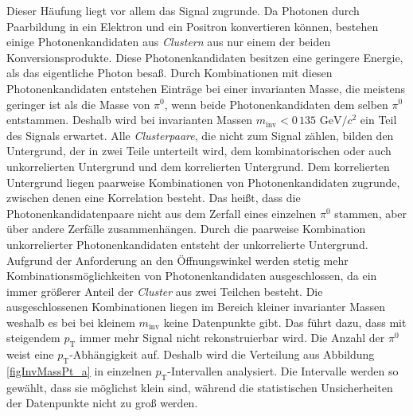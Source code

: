 Dieser Häufung liegt vor allem das Signal zugrunde.
Da Photonen durch Paarbildung in ein Elektron und ein Positron konvertieren können, bestehen einige Photonenkandidaten aus \textit{Clustern} aus nur einem der beiden Konversionsprodukte.
Diese Photonenkandidaten besitzen eine geringere Energie, als das eigentliche Photon besaß.
Durch Kombinationen mit diesen Photonenkandidaten entstehen Einträge bei einer invarianten Masse, die meistens geringer ist als die Masse von $\pi^{0}$, wenn beide Photonenkandidaten dem selben $\pi^{0}$ entstammen.
Deshalb wird bei invarianten Massen $m_\text{inv}<0\,135\text{ GeV}/c^{2}$ ein Teil des Signals erwartet.
\newline
Alle \textit{Clusterpaare}, die nicht zum Signal zählen, bilden den Untergrund, der in zwei Teile unterteilt wird, dem kombinatorischen oder auch unkorrelierten Untergrund und dem korrelierten Untergrund.
Dem korrelierten Untergrund liegen paarweise Kombinationen von Photonenkandidaten zugrunde, zwischen denen eine Korrelation besteht.
Das heißt, dass die Photonenkandidatenpaare nicht aus dem Zerfall eines einzelnen $\pi^{0}$ stammen, aber über andere Zerfälle zusammenhängen.
Durch die paarweise Kombination unkorrelierter Photonenkandidaten entsteht der unkorrelierte Untergrund.
\newline
Aufgrund der Anforderung an den Öffnungswinkel werden stetig mehr Kombinationsmöglichkeiten von Photonenkandidaten ausgeschlossen, da ein immer  größerer Anteil der \textit{Cluster} aus zwei Teilchen besteht.
Die ausgeschlossenen Kombinationen liegen im Bereich kleiner invarianter Massen weshalb es bei bei kleinem $m_{\text{inv}}$ keine Datenpunkte gibt.
Das führt dazu, dass mit steigendem $p_{\text{T}}$ immer mehr Signal nicht rekonstruierbar wird.
\newline
Die Anzahl der $\pi^{0}$ weist eine $p_{\text{T}}$-Abhängigkeit auf.
Deshalb wird die Verteilung aus Abbildung \ref{figInvMassPt_a} in einzelnen $p_{\text{T}}$-Intervallen analysiert.
Die Intervalle werden so gewählt, dass sie möglichst klein sind, während die statistischen Unsicherheiten der Datenpunkte nicht zu groß werden.
